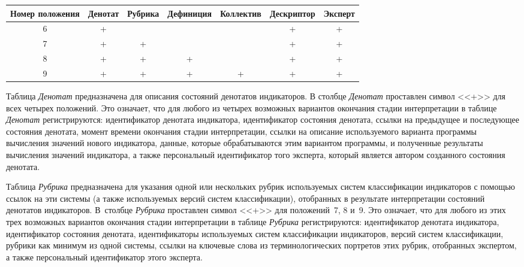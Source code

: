 \begin{multicols}{2}
\begin{table*}\small
\begin{center}
\vspace*{2ex}
\begin{tabular}{|c|c|c|c|c|c|c|}
\hline
Номер
положения&Денотат&Рубрика&Дефиниция&Коллектив&Дескриптор&Эксперт\\
\hline
6&+&&&&+&+\\
7&+&+&&&+&+\\
8&+&+&+&&+&+\\
9&+&+&+&+&+&+\\
\hline
\end{tabular}
\end{center}
\end{table*}

   Таблица \textit{Денотат} предназначена для описания состояний денотатов индикаторов. 
В столбце \textit{Денотат} проставлен символ <<+>> для всех четырех положений. Это 
означает, что для любого из четырех возможных вариантов окончания стадии 
интерпретации в таблице \textit{Денотат} регистрируются: идентификатор денотата 
индикатора, идентификатор состояния денотата, ссылки на предыдущее и последующее 
состояния денотата, момент времени окончания стадии интерпретации, ссылки на описание 
используемого варианта программы вычисления значений нового индикатора, данные, 
которые обрабатываются этим вариантом программы, и полученные результаты вычисления 
значений индикатора, а также персональный идентификатор того эксперта, который является 
автором созданного состояния денотата.
   
   Таблица \textit{Рубрика} предназначена для указания одной или нескольких рубрик 
используемых сис\-тем классификации индикаторов с помощью ссылок на эти системы (а 
также используемых версий систем классификации), отобранных в результате 
интерпретации состояний денотатов индикаторов. В~столбце \textit{Рубрика} проставлен 
символ <<+>> для положений~7, 8 и~9. Это означает, что для любого из этих трех 
возможных вариантов окончания стадии интерпретации в таблице \textit{Рубрика} 
регистрируются: идентификатор денотата индикатора, идентификатор состояния денотата, 
идентификаторы используемых систем классификации индикаторов, версий систем 
классификации, рубрики как минимум из одной системы, ссылки на ключевые слова из 
терминологических портретов этих рубрик, отобранных экспертом, а также персональный 
идентификатор этого эксперта.
   

\end{multicols}
